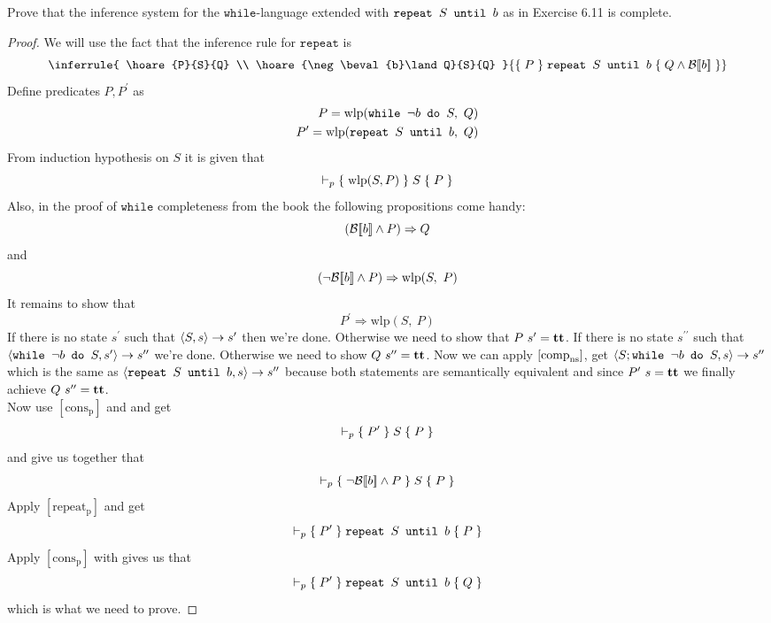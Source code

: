 Prove that the inference system for the $\mathtt{while}$-language extended with
$\texttt{repeat } S \texttt{ until } b$ as in Exercise 6.11 is complete.
\begin{proof}
We will use the fact that the inference rule for $\mathtt{repeat}$ is
\begin{equation*}
[\mathrm{repeat_p}]\\ \\
\inferrule
{
	\hoare{P}{S}{Q} \\ \hoare{\neg\beval{b}\land Q}{S}{Q}
}
{
	\hoare{P}{\srepeat{S}{b}}{Q\land\beval{b}}
}
\end{equation*}
Define predicates $P, P^\prime$ as
\begin{align*}
P=\mathrm{wlp}(\texttt{while } \neg b \texttt{ do } S,\ Q)\\
P^\prime=\mathrm{wlp}(\texttt{repeat } S \texttt{ until } b,\ Q)
\end{align*}
From induction hypothesis on $S$ it is given that
\begin{equation}\label{q624:e1}
\vdash_p{\{\;\mathrm{wlp}(S,P)\;\}\;S\;\{\;P\;\}}
\end{equation}
Also, in the proof of $\mathtt{while}$ completeness from the book the following propositions come handy:
\begin{equation}\label{q624:e2}
(\mathcal{B}[\![b]\!] \land P)\Rightarrow Q
\end{equation}
and
\begin{equation}\label{q624:e3}
(\neg\mathcal{B}[\![b]\!] \land P)\Rightarrow \mathrm{wlp}(S,\ P)
\end{equation}
It remains to show that
\begin{equation*}
P^\prime\Rightarrow \mathrm{wlp}(S,\ P)
\end{equation*}
If there is no state $s^\prime$ such that $\left<S,s\right> \rightarrow s^\prime$ then we're done. Otherwise we need to show that $P\ s^\prime =\textbf{tt}$. If there is no state $s^{\prime\prime}$ such that $\left<\texttt{while } \neg b \texttt{ do } S,s^\prime\right> \rightarrow s^{\prime\prime}$ we're done. Otherwise we need to show $Q\ s^{\prime\prime} =\textbf{tt}$.
Now we can apply $\left[\text{comp}_{\text{ns}}^{\text{}}\right]$, get $\left<S;\texttt{while } \neg b \texttt{ do } S,s\right> \rightarrow s^{\prime\prime}$ which is the same as $\left<\texttt{repeat } S \texttt{ until } b,s\right> \rightarrow s^{\prime\prime}$ because both statements are semantically equivalent and since $P^\prime\ s=\textbf{tt}$ we finally achieve $Q\ s^{\prime\prime} =\textbf{tt}$.\\

Now use $[\mathrm{cons_p}]$ and  and get
\begin{equation*}
\vdash_p{\{\;P^\prime\;\}\;S\;\{\;P\;\}}
\end{equation*}
 and  give us together that
\begin{equation*}
\vdash_p{\{\;\neg\mathcal{B}[\![b]\!] \land P\;\}\;S\;\{\;P\;\}}
\end{equation*}
Apply $[\mathrm{repeat_p}]$ and get
\begin{equation*}
\vdash_p{\{\;P^\prime\;\}\;\texttt{repeat } S \texttt{ until } b\;\{\;P\;\}}
\end{equation*}
Apply $[\mathrm{cons_p}]$ with  gives us that
\begin{equation*}
\vdash_p{\{\;P^\prime\;\}\;\texttt{repeat } S \texttt{ until } b\;\{\;Q\;\}}
\end{equation*}
which is what we need to prove.
\end{proof}
